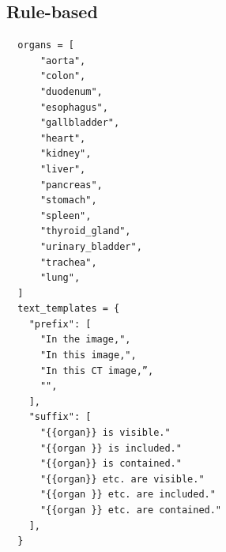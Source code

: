 \documentclass[bioengineering,article,submit,pdftex,moreauthors]{Definitions/mdpi}
\begin{document}
\subsection{Rule-based}
\begin{verbatim}
  organs = [
      "aorta",
      "colon",
      "duodenum",
      "esophagus",
      "gallbladder",
      "heart",
      "kidney",
      "liver",
      "pancreas",
      "stomach",
      "spleen",
      "thyroid_gland",
      "urinary_bladder",
      "trachea",
      "lung",
  ]
  text_templates = {
    "prefix": [
      "In the image,",
      "In this image,",
      "In this CT image,”,
      "",
    ],
    "suffix": [
      "{{organ}} is visible."
      "{{organ }} is included."
      "{{organ}} is contained."
      "{{organ}} etc. are visible."
      "{{organ }} etc. are included."
      "{{organ }} etc. are contained."
    ],
  }
\end{verbatim}
\end{document}

